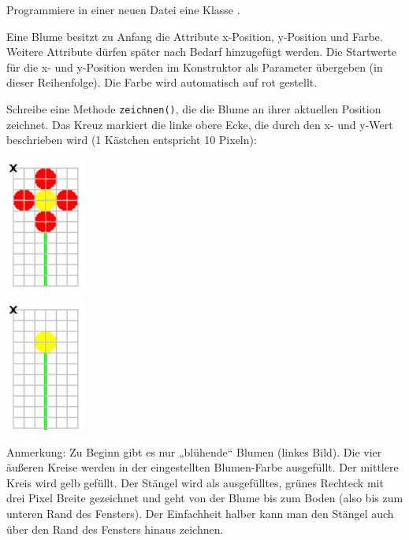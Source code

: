 \begin{compactenum}[a)]
\item Programmiere in einer neuen Datei eine Klasse .

Eine Blume besitzt zu Anfang die Attribute x-Position, y-Position und Farbe.
Weitere Attribute dürfen später nach Bedarf hinzugefügt werden. Die Startwerte
für die x- und y-Position werden im Konstruktor als Parameter übergeben (in
dieser Reihenfolge). Die Farbe wird automatisch auf rot gestellt.

Schreibe eine Methode \lstinline|zeichnen()|, die die Blume an ihrer aktuellen
Position zeichnet. Das Kreuz markiert die linke obere Ecke, die durch den x-
und y-Wert beschrieben wird (1 Kästchen entspricht 10 Pixeln):

\begin{minipage}{0.5\textwidth}
\begin{center}
\includegraphics[width=0.2\textwidth]{./inf/SEKII/10_Java_Klassen/blumeBluehend.png}
\end{center}
\end{minipage}
\begin{minipage}{0.5\textwidth}
\begin{center}
\includegraphics[width=0.2\textwidth]{./inf/SEKII/10_Java_Klassen/blumeVerwelkt.png}
\end{center}
\end{minipage}

Anmerkung: Zu Beginn gibt es nur „blühende“ Blumen (linkes Bild). Die vier
äußeren Kreise werden in der eingestellten Blumen-Farbe ausgefüllt. Der
mittlere Kreis wird gelb gefüllt. Der Stängel wird als ausgefülltes, grünes
Rechteck mit drei Pixel Breite gezeichnet und geht von der Blume bis zum Boden
(also bis zum unteren Rand des Fensters). Der Einfachheit halber kann man den
Stängel auch über den Rand des Fensters hinaus zeichnen.


\end{compactenum}
